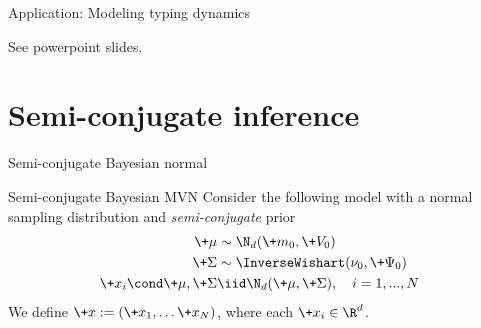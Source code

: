 \documentclass[10pt]{beamer}
\begin{document}
\begin{frame}{Application: Modeling typing dynamics}

See powerpoint slides.	
\end{frame}

\section{Semi-conjugate inference}

\begin{frame}{Semi-conjugate Bayesian normal}

\begin{block}{Semi-conjugate Bayesian MVN}
Consider the following model with a normal sampling distribution and \textit{semi-conjugate} prior 
\begin{align*}
\+\mu &\sim \N_{d}(\+m_0,\+V_0 ) \\
\+\Sigma &\sim \InverseWishart(\nu_0,  \+\Psi_0) \\
\+x_i \cond \+\mu,  \+\Sigma &\iid \N_{d}( \+\mu , \+\Sigma), \quad i=1,...,N
\end{align*}
We define $\+x := (\+x_1,  \hdots \+x_N)$,  where each $\+x_i \in \R^d$.
\end{block}




\end{frame}
\end{document}
